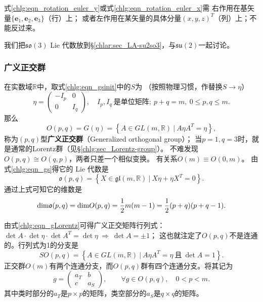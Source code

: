 式\eqref{chlg:eqn_rotation_euler_y}或式\eqref{chlg:eqn_rotation_euler_x}需
右作用在基矢量$\{\boldsymbol{e}_1,\boldsymbol{e}_2,\boldsymbol{e}_3\}$（行）上；
或者左作用在某矢量的具体分量$(x,y,z)^T$（列）上；不能反过来。

我们把$\mathfrak{so}(3)$ Lie 代数放到\S\ref{chlar:sec_LA-su2so3}，与$\mathfrak{su}(2)$一起讨论。

  

\subsubsection{广义正交群}\label{chlg:sec_Opq}
在实数域$\mathbb{R}$中，取式\eqref{chlg:eqn_gsinit}中的$S$为
（按照物理习惯，作替换$S\to \eta$）
\begin{equation}\label{chlg:eqn_generalized-Lorentz-metric}
    \eta = \begin{pmatrix}
        -I_p & 0 \\  0 & I_q
    \end{pmatrix},
    \quad I_p,I_q \  \text{是单位矩阵};\
    p+q=m,\ 0\leqslant p,q\leqslant m .
\end{equation}
那么
\begin{equation}\label{chlg:eqn_gLorentz}
    O(p,q)=G(\eta)= \left\{ A \in GL(m,\mathbb{R})\ |\ A \eta {A}^T =\eta \right\},
\end{equation}
称为$(p,q)$型\textbf{广义正交群}（Generalized orthogonal group）；
当$p=1,q=3$时，就是通常的Lorentz群（见\S\ref{chlg:sec_Lorentz-group}）。
不难发现$O(p,q)\cong O(q,p)$，两者只差一个相似变换。
有关系$O(m)\equiv O(0,m)$。
由式\eqref{chlg:eqn_gs}得它的 Lie 代数是
\begin{equation}\label{chlg:eqn_LA-opq}
    \mathfrak{o}(p,q)= \left\{ X \in 
    \mathfrak{gl}(m,\mathbb{R})\ |\  X\eta + \eta {X}^T =0 \right\}.
\end{equation}
通过上式可知它的维数是
\begin{equation}
    {\rm dim} \mathfrak{o}(p,q) = {\rm dim} O(p,q) = 
    \frac{1}{2}m(m-1)=\frac{1}{2}(p+q)(p+q-1).
\end{equation}

由式\eqref{chlg:eqn_gLorentz}可得广义正交矩阵行列式：
$ \det A \cdot\det\eta\cdot \det A^T = \det \eta \ \Rightarrow \ \det A = \pm 1$；
这也就注定了$O(p,q)$不是连通的。行列式为1的分支是
\begin{equation}\label{chlg:eqn_LG-sopq}
    SO(p,q)= \left\{ A \in GL(m,\mathbb{R})\ |\ A \eta {A}^T =\eta 
    \ \text{且}\ \det A = 1 \right\} .
\end{equation}
正交群$O(m)$有两个连通分支，而$O(p,q)$群有四个连通分支。将其记为
\begin{equation}
    g=\begin{pmatrix}
        a_T & b \\ c & a_S
    \end{pmatrix},
    \qquad \forall g\in O(p,q) ,\quad 0 < p < m.
\end{equation}
其中类时部分的$a_T$是$p\times p$的矩阵，类空部分的$a_S$是$q\times q$的矩阵。


